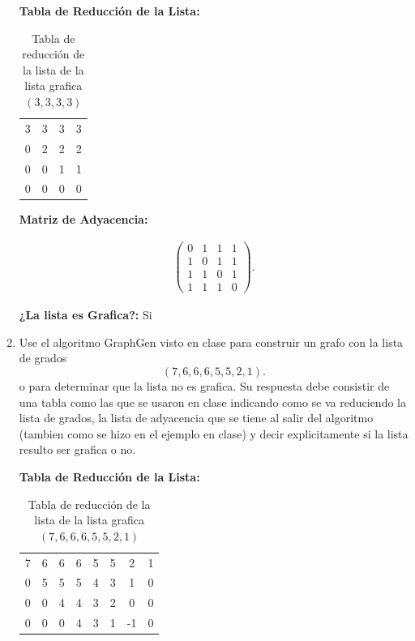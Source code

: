 \documentclass[12pt]{exam}
\begin{document}
\begin{enumerate}
  \textbf{Tabla de Reducción de la Lista:}

  \begin{table}[H]
    \centering
    \caption{Tabla de reducción de la lista de la lista grafica $\left( 3,3,3,3 \right) $}
    \label{tab:list1}
    \begin{tabular}{|c|c|c|c|}
      \hline
    3 & 3 & 3 & 3 \\
    0 & 2 & 2 & 2 \\
    0 & 0 & 1 & 1 \\
    0 & 0 & 0 & 0 \\
    \hline
    \end{tabular}
  \end{table}

  \textbf{Matriz de Adyacencia:}

  \begin{align*}
    \begin{pmatrix} 0 & 1 & 1 & 1 \\
      1 & 0 & 1 & 1 \\
      1 & 1 & 0 & 1 \\
      1 & 1 & 1 & 0
    \end{pmatrix} 
  .\end{align*}

  \textbf{¿La lista es Grafica?: } Si

  \item Use el algoritmo GraphGen visto en clase para construir un grafo con la lista de grados \[
  \left( 7,6,6,6,5,5,2,1 \right) 
  .\]
  o para determinar que la lista no es grafica. Su respuesta debe consistir de una tabla como las que se usaron en clase indicando como se va reduciendo la lista de grados, la lista de adyacencia que se tiene al salir del algoritmo (tambien como se hizo en el ejemplo en clase) y decir explicitamente si la lista resulto ser grafica o no.


  \textbf{Tabla de Reducción de la Lista:}

  \begin{table}[H]
    \centering
    \caption{Tabla de reducción de la lista de la lista grafica $\left( 7,6,6,6,5,5,2,1 \right) $}
    \label{tab:list1}
    \begin{tabular}{|c|c|c|c|c|c|c|c|}
      \hline
      7 & 6 & 6 & 6 & 5 & 5 & 2 & 1 \\
      0 & 5 & 5 & 5 & 4 & 3 & 1 & 0 \\
      0 & 0 & 4 & 4 & 3 & 2 & 0 & 0 \\
      0 & 0 & 0 & 4 & 3 & 1 & -1 & 0\\
    \hline
    \end{tabular}
  \end{table}


\end{enumerate}
\end{document}
